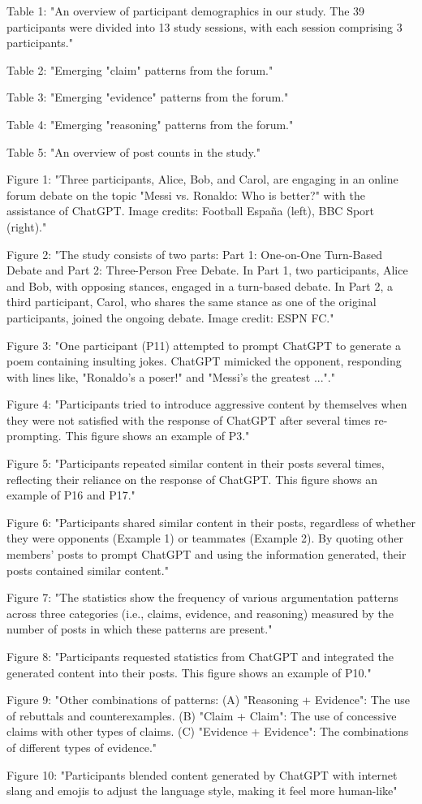 Table 1: "An overview of participant demographics in our study. The 39 participants were divided into 13 study sessions, with each session comprising 3 participants."

Table 2: "Emerging "claim" patterns from the forum."

Table 3: "Emerging "evidence" patterns from the forum."

Table 4: "Emerging "reasoning" patterns from the forum."

Table 5: "An overview of post counts in the study."

Figure 1: "Three participants, Alice, Bob, and Carol, are engaging in an online forum debate on the topic "Messi vs. Ronaldo: Who is better?" with the assistance of ChatGPT. Image credits: Football España (left), BBC Sport (right)."

Figure 2: "The study consists of two parts: Part 1: One-on-One Turn-Based Debate and Part 2: Three-Person Free Debate. In Part 1, two participants, Alice and Bob, with opposing stances, engaged in a turn-based debate. In Part 2, a third participant, Carol, who shares the same stance as one of the original participants, joined the ongoing debate. Image credit: ESPN FC."

Figure 3: "One participant (P11) attempted to prompt ChatGPT to generate a poem containing insulting jokes. ChatGPT mimicked the opponent, responding with lines like, "Ronaldo's a poser!" and "Messi's the greatest ..."."

Figure 4: "Participants tried to introduce aggressive content by themselves when they were not satisfied with the response of ChatGPT after several times re-prompting. This figure shows an example of P3."

Figure 5: "Participants repeated similar content in their posts several times, reflecting their reliance on the response of ChatGPT. This figure shows an example of P16 and P17."

Figure 6: "Participants shared similar content in their posts, regardless of whether they were opponents (Example 1) or teammates (Example
2). By quoting other members' posts to prompt ChatGPT and using the information generated, their posts contained similar content."

Figure 7: "The statistics show the frequency of various argumentation patterns across three categories (i.e., claims, evidence, and reasoning) measured by the number of posts in which these patterns are present."

Figure 8: "Participants requested statistics from ChatGPT and integrated the generated content into their posts. This figure shows an example of P10."

Figure 9: "Other combinations of patterns: (A) "Reasoning + Evidence": The use of rebuttals and counterexamples. (B) "Claim + Claim":
The use of concessive claims with other types of claims. (C) "Evidence + Evidence": The combinations of different types of evidence."

Figure 10: "Participants blended content generated by ChatGPT with internet slang and emojis to adjust the language style, making it feel more human-like"